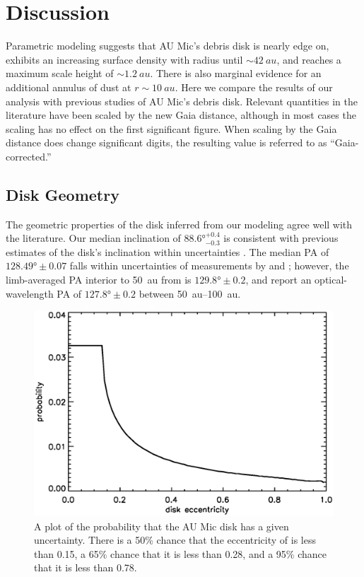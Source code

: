 \documentclass[modern]{aastex62}
\begin{document}
\section{Discussion}
\label{section: discussion}

Parametric modeling suggests that AU Mic's debris disk is nearly edge on, exhibits an increasing surface density with radius until $\sim\SI{42}{au}$, and reaches a maximum scale height of $\sim\SI{1.2}{au}$.
There is also marginal evidence for an additional annulus of dust at $r \sim \SI{10}{au}$.
Here we compare the results of our analysis with previous studies of AU Mic's debris disk.
Relevant quantities in the literature have been scaled by the new Gaia distance, although in most cases the scaling has no effect on the first significant figure.
When scaling by the Gaia distance does change significant digits, the resulting value is referred to as ``Gaia-corrected.''

\subsection{Disk Geometry}
\label{subsection: disk geometry}

The geometric properties of the disk inferred from our modeling agree well with the literature. 
Our median inclination of $\ang[angle-symbol-over-decimal]{88.6}^{+0.4}_{-0.3}$ is consistent with previous estimates of the disk's inclination within uncertainties \citep{metchev05,krist05}.
The median PA of $\ang[angle-symbol-over-decimal]{128.49} \pm 0.07$ falls within uncertainties of measurements by \citet{macgregor13} and \citet{krist05}; however, the limb-averaged PA interior to \SI{50}{au} from \citet{metchev05} is $\ang[angle-symbol-over-decimal]{129.8} \pm 0.2$, and \citet{schneider14} report an optical-wavelength PA of $\ang[angle-symbol-over-decimal]{127.8} \pm 0.2$ between \SIrange{50}{100}{au}.

\begin{figure}
  \centering
  \includegraphics[width=\linewidth]{../figures/eccdiffprobplot.eps}
  \caption{
    A plot of the probability that the AU Mic disk has a given uncertainty.
    There is a 50\% chance that the eccentricity of is less than 0.15, a 65\% chance that it is less than 0.28, and a 95\% chance that it is less than 0.78.
  }
  \label{fig: eccentricity}
\end{figure}
\end{document}
